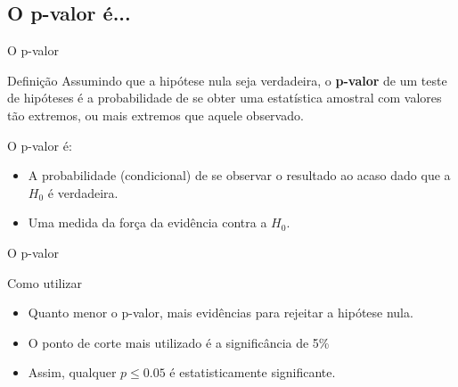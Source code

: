 \documentclass{beamer}
\begin{document}
\subsection{O p-valor é...}

\begin{frame}{O p-valor}
  \begin{block}{Definição}
    Assumindo que a hipótese nula seja verdadeira, o {\bf p-valor} de
    um teste de hipóteses é a probabilidade de se obter uma
    estatística amostral com valores \alert{tão extremos, ou mais
      extremos} que aquele observado.
  \end{block}

  O p-valor \alert{é}:
  \begin{itemize}
    \footnotesize
  \item A probabilidade (condicional) de se observar o resultado ao
    acaso \alert{dado que} a $H_0$ é verdadeira.
  \item Uma medida da força da evidência \alert{contra} a $H_0$.
  \end{itemize}
\end{frame}

\begin{frame}{O p-valor}
  \begin{block}{Como utilizar}
    \begin{itemize}
    \item Quanto menor o p-valor, mais evidências para rejeitar a
      hipótese nula.
    \item O ponto de corte mais utilizado é a significância de 5\%
    \item Assim, qualquer $p \le 0.05$ é estatisticamente significante.
    \end{itemize}
  \end{block}
\end{frame}


\end{document}
